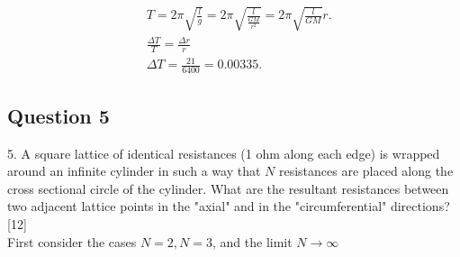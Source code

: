 \documentclass{article}
\begin{document}
$$
\begin{aligned}
& T=2 \pi \sqrt{\frac{l}{g}}=2 \pi \sqrt{\frac{l}{\frac{G M}{r^2}}}=2 \pi \sqrt{\frac{l}{G M}} r . \\
& \frac{\Delta T}{T}=\frac{\Delta r}{r} \\
& \Delta T=\frac{21}{6400}=0.00335 .
\end{aligned}
$$
\subsection{Question 5}
5. A square lattice of identical resistances (1 ohm along each edge) is wrapped around an infinite cylinder in such a way that $N$ resistances are placed along the cross sectional circle of the cylinder. What are the resultant resistances between two adjacent lattice points in the "axial" and in the "circumferential" directions? [12] \\
First consider the cases $N=2, N=3$, and the limit $N \rightarrow \infty$
\end{document}

